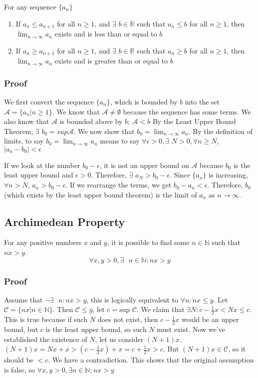 \documentclass[11 pt, twoside]{article}
\begin{document}
For any sequence $\{a_n\}$
\begin{enumerate}
\item If $a_n \leq a_{n+1}$ for all $n \geq 1$, and $\exists$ $b \in
\mathbb{R}$ such that $a_n \leq b$ for all $n \geq 1$,  then
$\lim_{n\to\infty} a_n$ exists and is less than or equal to $b$
\item If $a_n \geq a_{n+1}$ for all $n \geq 1$, and $\exists$ $b \in
\mathbb{R}$ such that $a_n \geq b$ for all $n \geq 1$, then
$\lim_{n\to\infty} a_n$ exists and is greater than or equal to $b$
\end{enumerate}

\subsubsection{Proof}

We first convert the sequence $\{a_n\}$, which is bounded by $b$ into the
set $\mathcal{A} = \{a_n | n \geq 1\}$. We know that $\mathcal{A} \neq
\emptyset$ because the sequence has some terms. We also know that $\mathcal{A}$
is bounded above by $b$; $\mathcal{A} < b$
By the Least Upper Bound Theorem, $\exists$ $b_0 = sup \mathcal{A}$. We now show that $b_0 = \lim_{n\to\infty}a_n$. By the definition of limits, to say $b_0 =
\lim_{n\to\infty} a_n$ means to say $\forall \epsilon > 0, \exists$ $N > 0,
\forall n \geq N$, $|a_n - b_0| < \epsilon$

If we look at the number $b_0 - \epsilon$, it is not an upper bound on
$\mathcal{A}$ because $b_0$ is the least upper bound and $\epsilon > 0$.
Therefore, $\exists$ $a_N > b_0 - \epsilon$. Since $\{a_n\}$ is increasing,
$\forall n > N$, $a_n > b_0 - \epsilon$. If we rearrange the terms, we get $b_0
- a_n < \epsilon$. Therefore, $b_0$ (which exists by the least upper bound
theorem) is the limit of $a_n$ as $n \to \infty$.

\subsection{Archimedean Property}

For any positive numbers $x$ and $y$, it is possible to find some $n \in
\mathbb{N}$ such that $nx > y$.
$$\forall x, y > 0, \exists\text{ } n \in \mathbb{N}: nx > y$$

\subsubsection{Proof}
Assume that $\neg \exists\text{ } n:nx > y$, this is logically equivalent to
$\forall n: nx \leq y$. Let $\mathcal{C} = \{nx | n \in \mathbb{N}\}$. Then
$\mathcal{C} \leq y$, let $c = \text{sup } \mathcal{C}$.
We claim that $\exists N: c-\frac{1}{2}x < Nx \leq c$. This is true because if
such $N$ does not exist, then $c - \frac{1}{2}x$ would be an upper bound, but
$c$ is the least upper bound, so such $N$ must exist.
Now we've established the existence of $N$, let us consider $(N + 1)x$. $(N +
1)x = Nx + x > (c - \frac{1}{2}x) + x = c + \frac{1}{2}x > c$. But $(N + 1)x \in
\mathcal{C}$, so it should be $< c$. We have a contradiction. This shows that
the original assumption is false, so $\forall x, y > 0, \exists n \in
\mathbb{N}: nx > y$
\end{document}
